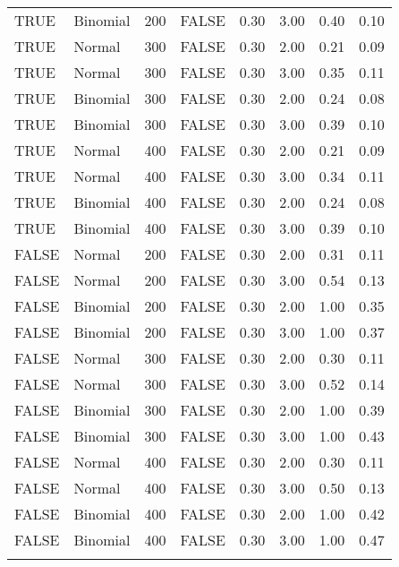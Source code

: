 \begin{longtable}{llrlrrrr}
  TRUE & Binomial & 200 & FALSE & 0.30 & 3.00 & 0.40 & 0.10 \\ 
  TRUE & Normal & 300 & FALSE & 0.30 & 2.00 & 0.21 & 0.09 \\ 
  TRUE & Normal & 300 & FALSE & 0.30 & 3.00 & 0.35 & 0.11 \\ 
  TRUE & Binomial & 300 & FALSE & 0.30 & 2.00 & 0.24 & 0.08 \\ 
  TRUE & Binomial & 300 & FALSE & 0.30 & 3.00 & 0.39 & 0.10 \\ 
  TRUE & Normal & 400 & FALSE & 0.30 & 2.00 & 0.21 & 0.09 \\ 
  TRUE & Normal & 400 & FALSE & 0.30 & 3.00 & 0.34 & 0.11 \\ 
  TRUE & Binomial & 400 & FALSE & 0.30 & 2.00 & 0.24 & 0.08 \\ 
  TRUE & Binomial & 400 & FALSE & 0.30 & 3.00 & 0.39 & 0.10 \\ 
  FALSE & Normal & 200 & FALSE & 0.30 & 2.00 & 0.31 & 0.11 \\ 
  FALSE & Normal & 200 & FALSE & 0.30 & 3.00 & 0.54 & 0.13 \\ 
  FALSE & Binomial & 200 & FALSE & 0.30 & 2.00 & 1.00 & 0.35 \\ 
  FALSE & Binomial & 200 & FALSE & 0.30 & 3.00 & 1.00 & 0.37 \\ 
  FALSE & Normal & 300 & FALSE & 0.30 & 2.00 & 0.30 & 0.11 \\ 
  FALSE & Normal & 300 & FALSE & 0.30 & 3.00 & 0.52 & 0.14 \\ 
  FALSE & Binomial & 300 & FALSE & 0.30 & 2.00 & 1.00 & 0.39 \\ 
  FALSE & Binomial & 300 & FALSE & 0.30 & 3.00 & 1.00 & 0.43 \\ 
  FALSE & Normal & 400 & FALSE & 0.30 & 2.00 & 0.30 & 0.11 \\ 
  FALSE & Normal & 400 & FALSE & 0.30 & 3.00 & 0.50 & 0.13 \\ 
  FALSE & Binomial & 400 & FALSE & 0.30 & 2.00 & 1.00 & 0.42 \\ 
  FALSE & Binomial & 400 & FALSE & 0.30 & 3.00 & 1.00 & 0.47 \\ 
   \hline
\hline
\caption{} 
\end{longtable}
